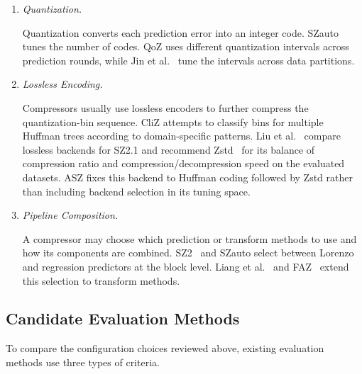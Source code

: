 \begin{enumerate}
\item \emph{Quantization.}\par\noindent\mbox{\hspace{1em}}Quantization converts each prediction error into an integer code. SZauto tunes the number of codes. QoZ uses different quantization intervals across prediction rounds, while Jin et al.~\cite{jin2022improving} tune the intervals across data partitions.

\item \emph{Lossless Encoding.}\par\noindent\mbox{\hspace{1em}}Compressors usually use lossless encoders to further compress the quantization-bin sequence. CliZ attempts to classify bins for multiple Huffman trees according to domain-specific patterns. Liu et al.~\cite{liu2021improving} compare lossless backends for SZ2.1 and recommend Zstd~\cite{ycollet2021zstd} for its balance of compression ratio and compression/decompression speed on the evaluated datasets. ASZ fixes this backend to Huffman coding followed by Zstd rather than including backend selection in its tuning space.

\item \emph{Pipeline Composition.}\par\noindent\mbox{\hspace{1em}}A compressor may choose which prediction or transform methods to use and how its components are combined. SZ2~\cite{liang2018error} and SZauto select between Lorenzo and regression predictors at the block level. Liang et al.~\cite{liang2019significantly} and FAZ~\cite{liu2023faz} extend this selection to transform methods.
\end{enumerate}

\subsection{Candidate Evaluation Methods}
\label{sec:related-work:evaluation}

To compare the configuration choices reviewed above, existing evaluation methods use three types of criteria.

